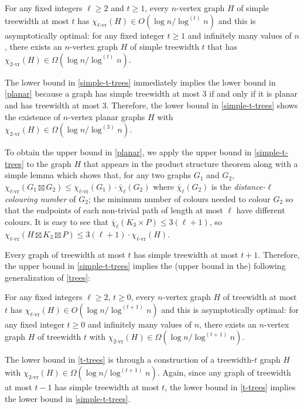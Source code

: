 \documentclass[kpfonts]{patmorin}
\newcommand{\defin}[1]{\emph{\color{brightmaroon}#1}}
\newcommand{\rn}[1]{\chi_{\operatorname{#1-vr}}}
\newcommand{\trn}{\rn{2}}
\newcommand{\lrn}{\rn{\ell}}
\newcommand{\dlcn}{\bar{\chi}_\ell}
\theoremstyle{named}
\begin{document}
\begin{thm}\label{simple-t-trees}
    For any fixed integers $\ell\ge 2$ and $t\ge 1$, every $n$-vertex graph $H$ of simple treewidth at most $t$ has $\lrn(H) \in O(\log n/\log^{(t)}n)$ and this is asymptotically optimal: for any fixed integer $t\ge 1$ and infinitely many values of $n$, there exists an $n$-vertex graph $H$ of simple treewidth $t$ that has $\trn(H)\in\Omega(\log n/\log^{(t)} n)$.
\end{thm}

The lower bound in \cref{simple-t-trees} immediately implies the lower bound in \cref{planar} because a graph has simple treewidth at most 3 if and only if it is planar and has treewidth at most 3. Therefore, the lower bound in \cref{simple-t-trees} shows the existence of $n$-vertex planar graphs $H$ with $\trn(H)\in\Omega(\log n/\log^{(3)} n)$.

To obtain the upper bound in \cref{planar}, we apply the upper bound in \cref{simple-t-trees} to the graph $H$ that appears in the product structure theorem along with a simple lemma which shows that, for any two graphs $G_1$ and $G_2$, $\lrn(G_1\boxtimes G_2)\le \lrn(G_1)\cdot\dlcn(G_2)$ where $\dlcn(G_2)$ is the \defin{distance-$\ell$ colouring number} of $G_2$;  the minimum number of colours needed to colour $G_2$ so that the endpoints of each non-trivial path of length at most $\ell$ have different colours.  It is easy to see that $\dlcn(K_3\times P)\le 3(\ell+1)$, so $\lrn(H\boxtimes K_3\boxtimes P)\le 3(\ell+1)\cdot\lrn(H)$.

Every graph of treewidth at most $t$ has simple treewidth at most $t+1$. Therefore, the upper bound in \cref{simple-t-trees} implies the (upper bound in the) following generalization of \cref{trees}:

\begin{thm}\label{t-trees}
    For any fixed integers $\ell\ge 2$, $t\ge 0$, every $n$-vertex graph $H$ of treewidth at most $t$ has $\lrn(H) \in O(\log n/\log^{(t+1)} n)$ and this is asymptotically optimal: for any fixed integer $t\ge 0$ and infinitely many values of $n$, there exists an $n$-vertex graph $H$ of treewidth $t$ with $\trn(H)\in\Omega(\log n/\log^{(t+1)} n)$.
\end{thm}

The lower bound in \cref{t-trees} is through a construction of a treewidth-$t$ graph $H$ with $\trn(H)\in\Omega(\log n/\log^{(t+1)} n)$.  Again, since any graph of treewidth at most $t-1$ has simple treewidth at most $t$, the lower bound in \cref{t-trees} implies the lower bound in \cref{simple-t-trees}.
\end{document}
